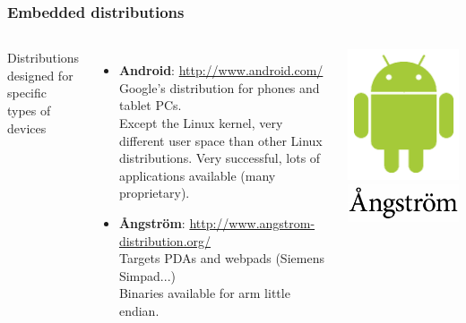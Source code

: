 \begin{frame}
  \frametitle{Embedded distributions}
  \small
  \begin{columns}
    Distributions designed for specific types of devices
    \begin{itemize}
    \item {\bf Android}: \url{http://www.android.com/}\\
      Google's distribution for phones and tablet PCs.\\
      Except the Linux kernel, very different user space
      than other Linux distributions. Very successful,
      lots of applications available (many proprietary).
    \item {\bf Ångström}: \url{http://www.angstrom-distribution.org/}\\
      Targets PDAs and webpads (Siemens Simpad...)\\
      Binaries available for arm little endian.
    \end{itemize}
    \includegraphics[width=\textwidth]{slides/sysdev-embedded-linux/android.png}\\
    \includegraphics[width=\textwidth]{slides/sysdev-embedded-linux/angstrom.png}\\
  \end{columns}
\end{frame}


